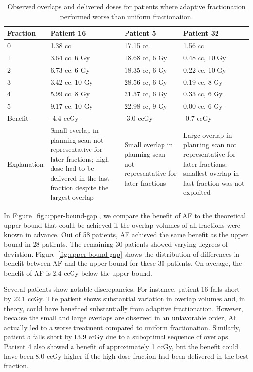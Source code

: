 \documentclass[11pt]{article}
\newcommand{\toprule}{\hline}
\newcommand{\midrule}{\hline}
\newcommand{\bottomrule}{\hline}
\begin{document}
\begin{table}[ht]
\centering
\caption{Observed overlaps and delivered doses for patients where adaptive fractionation performed worse than uniform fractionation.}
\label{tab:worst-cases-2025}
\begin{tabular}{llll}
\toprule
Fraction & Patient 16 & Patient 5 & Patient 32 \\
\midrule
0 & 1.38 cc & 17.15 cc & 1.56 cc \\
1 & 3.64 cc, 6 Gy & 18.68 cc, 6 Gy & 0.48 cc, 10 Gy \\
2 & 6.73 cc, 6 Gy & 18.35 cc, 6 Gy & 0.22 cc, 10 Gy \\
3 & 3.42 cc, 10 Gy & 28.56 cc, 6 Gy & 0.19 cc, 8 Gy \\
4 & 5.99 cc, 8 Gy & 21.37 cc, 6 Gy & 0.33 cc, 6 Gy \\
5 & 9.17 cc, 10 Gy & 22.98 cc, 9 Gy & 0.00 cc, 6 Gy \\
Benefit & -4.4 ccGy & -3.0 ccGy & -0.7 ccGy \\
Explanation & Small overlap in planning scan not representative for later fractions; high dose had to be delivered in the last fraction despite the largest overlap & Small overlap in planning scan not representative for later fractions & Large overlap in planning scan not representative for later fractions; smallest overlap in last fraction was not exploited \\
\bottomrule
\end{tabular}
\end{table}

In Figure~\ref{fig:upper-bound-gap}, we compare the benefit of AF to the theoretical upper bound that could be achieved if the overlap volumes of all fractions were known in advance. Out of 58 patients, AF achieved the same benefit as the upper bound in 28 patients. The remaining 30 patients showed varying degrees of deviation. Figure~\ref{fig:upper-bound-gap} shows the distribution of differences in benefit between AF and the upper bound for these 30 patients. On average, the benefit of AF is 2.4 ccGy below the upper bound.

Several patients show notable discrepancies. For instance, patient 16 falls short by 22.1 ccGy. The patient shows substantial variation in overlap volumes and, in theory, could have benefited substantially from adaptive fractionation. However, because the small and large overlaps are observed in an unfavorable order, AF actually led to a worse treatment compared to uniform fractionation. Similarly, patient 5 falls short by 13.9 ccGy due to a suboptimal sequence of overlaps. Patient 4 also showed a benefit of approximately 1 ccGy, but the benefit could have been 8.0 ccGy higher if the high-dose fraction had been delivered in the best fraction.
\end{document}
